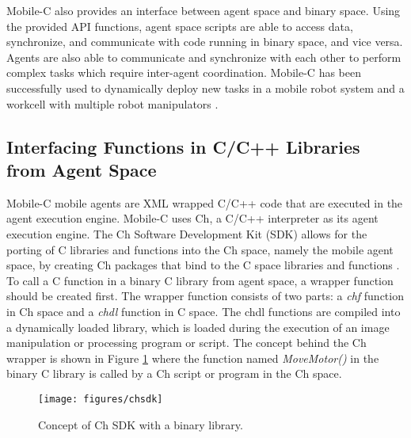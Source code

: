       Mobile-C also provides an interface between agent space and binary space.
      Using the provided API functions, agent space scripts are able to access 
        data, synchronize, and communicate with code running in binary space, and 
        vice versa.
      Agents are also able to communicate and synchronize with each other to 
        perform complex tasks which require inter-agent coordination.
      Mobile-C has been successfully used to dynamically deploy new tasks in a 
        mobile robot system and a workcell with multiple robot manipulators
        \cite{Nestinger_c2007,mobilec_robot_webpage,Chou2007,mc_khepera}.

      \subsection{Interfacing Functions in C/C++ Libraries from Agent Space}
        \label{sec:chsdk}
        Mobile-C mobile agents are XML wrapped C/C++ code that are executed
          in the agent execution engine.
        Mobile-C uses Ch, a C/C++ interpreter as its agent execution engine.
        The Ch Software Development Kit (SDK) allows for the porting of C libraries
          and functions into the Ch space, namely the mobile agent space, by 
          creating Ch packages that bind to the C space libraries and functions 
          \cite{chsdk}. 
        To call a C function in a binary C library from agent space, 
          a wrapper function should be created first. 
        The wrapper function consists of two parts: a {\it chf} function in Ch space 
          and a {\it chdl} function in C space. 
        The chdl functions are compiled into a dynamically loaded library, which is 
          loaded during the execution of an image manipulation or processing program 
          or script.
        The concept behind the Ch wrapper is shown in Figure \ref{FIG:ChSDK} where
          the function named {\it MoveMotor()} in the binary C library is
          called by a Ch script or program in the Ch space.
        \begin{figure}
        \centerline{\texttt{[image: figures/chsdk]}}
        \caption{Concept of Ch SDK with a binary library.}
        \label{FIG:ChSDK}
        \end{figure}


